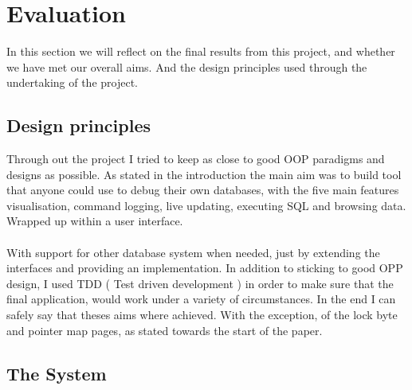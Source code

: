 \section{Evaluation}
\label{sec:evaluation}

In this section we will reflect on the final results from this project, and whether we have met our overall aims. And the design principles used through the undertaking of the project.

\subsection{Design principles}
\label{subsec:design_principles}

Through out the project I tried to keep as close to good OOP paradigms and designs as possible. As stated in the introduction the main aim was to build tool that anyone could use to debug their own databases, with the five main features visualisation, command logging, live updating, executing SQL and browsing data. Wrapped up within a user interface. 
\\\\
With support for other database system when needed, just by extending the interfaces and providing an implementation. In addition to sticking to good OPP design, I used TDD ( Test driven development ) in order to make sure that the final application, would work under a variety of circumstances. In the end I can safely say that theses aims where achieved. With the exception, of the lock byte and pointer map pages, as stated towards the start of the paper. 

\subsection{The System}
\label{subsec:system_eval}

